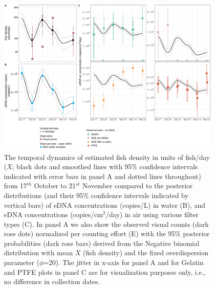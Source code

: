 \documentclass{article}
\begin{document}
\begin{figure}[tbhp] 
\centering
\includegraphics[width=16.5cm]{../../Plots/Figure_2.pdf}  
\caption{The temporal dynamics of estimated fish density in units of fish/day ($X$; black dots and smoothed lines with 95\% confidence intervals indicated with error bars in panel A and dotted lines throughout) from 17$^{th}$ October to 21$^{st}$ November compared to the posterior distributions (and their 95\% confidence intervals indicated by vertical bars) of eDNA concentrations (copies/L) in water (B), and eDNA concentrations (copies/cm$^2$/day) in air using various filter types (C). In panel A we also show the observed visual counts (dark rose dots) normalized per counting effort (E) with the 95\% posterior probabilities (dark rose bars) derived from the Negative binomial distribution with mean $X$ (fish density) and the fixed overdispersion parameter ($\phi$=20). The jitter in x-axis for panel A and for Gelatin and PTFE plots in panel C are for visualization purposes only, i.e., no difference in collection dates.}
\label{fig:fig1}
\end{figure}
\end{document}
